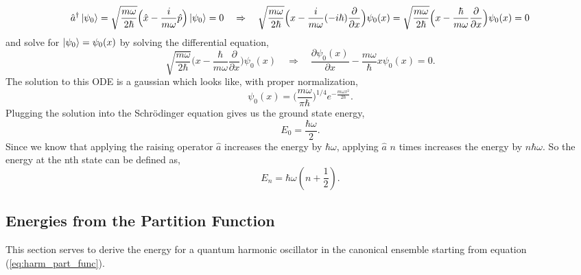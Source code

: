 \documentclass{article}
\newcommand{\be}{\begin{equation}}
\newcommand{\ee}{\end{equation}}
\begin{document}
\be
  \hat{a}^{\dagger} \ket{\psi_0} = \sqrt{\frac{m \omega}{2\hbar}}\Big(\hat{x} - \frac{i}{m \omega} \hat{p} \Big)\ket{\psi_0} = 0 \quad \Rightarrow \quad \sqrt{\frac{m \omega}{2\hbar}}\Big(x - \frac{i}{m \omega} (-i \hbar) \frac{\partial}{\partial x} \Big) \psi_0(x) = \sqrt{\frac{m \omega}{2\hbar}}\Big(x - \frac{\hbar}{m \omega} \frac{\partial}{\partial x} \Big) \psi_0(x) = 0
\ee
and solve for $\ket{\psi_0} = \psi_0(x)$ by solving the differential equation,
\be
  \sqrt{\frac{m \omega}{2\hbar}}\Big(x - \frac{\hbar}{m \omega} \frac{\partial}{\partial x} \Big) \psi_0(x) \quad \Rightarrow \quad \frac{\partial \psi_0(x)}{\partial x} - \frac{m \omega}{\hbar} x \psi_0(x) = 0 .
\ee
The solution to this ODE is a gaussian which looks like, with proper normalization,
\be
  \psi_0(x) = \Big(\frac{m \omega}{\pi \hbar}\Big)^{1/4} e^{-\frac{m \omega x^2}{2 \hbar}} .
\ee
Plugging the solution into the Schr\"odinger equation gives us the ground state energy,
\be
  E_0 = \frac{\hbar \omega}{2} .
\ee
Since we know that applying the raising operator $\hat{a}$ increases the energy by $\hbar \omega$, applying $\hat{a}$ $n$ times increases the energy by $n \hbar \omega$.
So the energy at the nth state can be defined as,
\be
  E_n = \hbar \omega(n + \frac{1}{2}) .
\ee

\subsection{Energies from the Partition Function}
This section serves to derive the energy for a quantum harmonic oscillator in the canonical ensemble starting from equation (\ref{eq:harm_part_func}).
\end{document}

